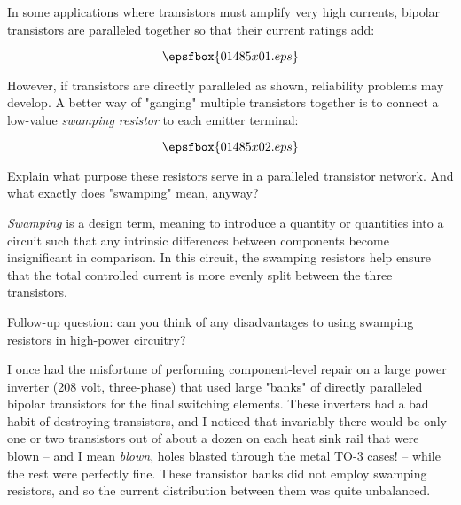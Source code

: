 

In some applications where transistors must amplify very high currents, bipolar transistors are paralleled together so that their current ratings add:

$$\epsfbox{01485x01.eps}$$

However, if transistors are directly paralleled as shown, reliability problems may develop.  A better way of "ganging" multiple transistors together is to connect a low-value {\it swamping resistor} to each emitter terminal:

$$\epsfbox{01485x02.eps}$$

Explain what purpose these resistors serve in a paralleled transistor network.  And what exactly does "swamping" mean, anyway?







{\it Swamping} is a design term, meaning to introduce a quantity or quantities into a circuit such that any intrinsic differences between components become insignificant in comparison.  In this circuit, the swamping resistors help ensure that the total controlled current is more evenly split between the three transistors.

\vskip 10pt

Follow-up question: can you think of any disadvantages to using swamping resistors in high-power circuitry?







I once had the misfortune of performing component-level repair on a large power inverter (208 volt, three-phase) that used large "banks" of directly paralleled bipolar transistors for the final switching elements.  These inverters had a bad habit of destroying transistors, and I noticed that invariably there would be only one or two transistors out of about a dozen on each heat sink rail that were blown -- and I mean {\it blown}, holes blasted through the metal TO-3 cases! -- while the rest were perfectly fine.  These transistor banks did not employ swamping resistors, and so the current distribution between them was quite unbalanced.

